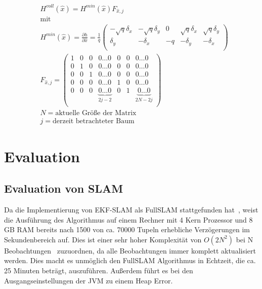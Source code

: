 \documentclass[11pt]{scrartcl}
\begin{document}
{\begin{equation}\label{SLAM-Observation-Model-Jakobi-Matrix}
\begin{split}
	&H^{voll}(\hat{x}) = H^{min}(\hat{x})F_{\hat{x},j} \\
	&\text{mit} \\
	&H^{min}(\hat{x}) = \frac{\partial h}{\partial \hat{x}} = \frac{1}{q} \begin{pmatrix}
		-\sqrt{q}\delta_x & -\sqrt{q}\delta_y & 0 & \sqrt{q}\delta_x & \sqrt{q}\delta_y \\
		\delta_y & -\delta_x & -q & -\delta_y & -\delta_x\\
	\end{pmatrix} \\
	&F_{\hat{x},j} = \begin{pmatrix}
		1 & 0 & 0 & 0 \dots 0 & 0 & 0 & 0 \dots 0 \\
		0 & 1 & 0 & 0 \dots 0 & 0 & 0 & 0 \dots 0 \\
		0 & 0 & 1 & 0 \dots 0 & 0 & 0 & 0 \dots 0 \\
		0 & 0 & 0 & 0 \dots 0 & 1 & 0 & 0 \dots 0 \\
		0 & 0 & 0 & \underbrace{0 \dots 0}_{2j-2} & 0 & 1 & \underbrace{0 \dots 0}_{2N-2j} \\
	\end{pmatrix} \\
	&N= \text{aktuelle Größe der Matrix} \\
	&j= \text{derzeit betrachteter Baum}
\end{split}
\end{equation}

\section{Evaluation}\label{Evaluation}
\subsection{Evaluation von SLAM}\label{SLAM-Evaluation}
Da die Implementierung von EKF-SLAM als FullSLAM stattgefunden hat~\cite{Freiburg_SLAM_Formeln}, weist die Ausführung des Algorithmus auf einem Rechner mit 4 Kern Prozessor und 8 GB RAM bereits nach 1500 von ca. 70000 Tupeln erhebliche Verzögerungen im Sekundenbereich auf. Dies ist einer sehr hoher Komplexität von $O(2N^2)$ bei N Beobachtungen~\cite{ute_SLAM} zuzuordnen, da alle Beobachtungen immer komplett aktualisiert werden. Dies macht es unmöglich den FullSLAM Algorithmus in Echtzeit, die ca. 25 Minuten beträgt, auszuführen. Außerdem führt es bei den Ausgangseinstellungen der JVM zu einem Heap Error.

}
\end{document}
